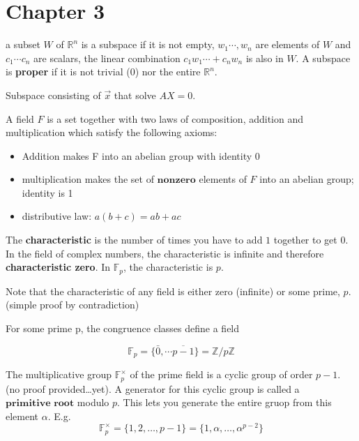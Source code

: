 \section{Chapter 3}


\begin{definition}

  a subset $W$ of $\mathbb{R}^{n}$ is a subspace if it is not empty,
  $w_{1}\cdots, w_{n}$ are elements of $W$ and $c_{1}\cdots c_{n}$ are scalars,
  the linear combination $c_{1}w_{1}\cdots + c_{n}w_{n}$ is also in $W$.
  A subspace is \textbf{proper} if it is not trivial (${0}$) nor the entire
  $\mathbb{R}^{n}$.

\end{definition}

\begin{definition}

  Subspace consisting of $\vec{x}$ that solve $AX=0$.

\end{definition}

\begin{definition}

  A field $F$ is a set together with two laws of composition,
  addition and multiplication which satisfy the following axioms:
  \begin{itemize}
    \item Addition makes F into an abelian group with identity 0
    \item multiplication makes the set of $\textbf{nonzero}$ elements
      of $F$ into an abelian group; identity is 1
    \item distributive law: $a(b+c)=ab + ac$

  \end{itemize}

  The \textbf{characteristic} is the number of times you have to add $1$ together
  to get $0$. In the field of complex numbers, the characteristic is infinite
  and therefore \textbf{characteristic zero}. In $\mathbb{F}_{p}$, the
  characteristic is $p$.

  Note that the characteristic of any field is either zero (infinite) or some
  prime, $p$. (simple proof by contradiction)


\end{definition}


\begin{definition}

  For some prime p, the congruence classes define a field

  \[\mathbb{F}_{p}=\{\bar{0},\cdots \overline{p-1}\}=\mathbb{Z}/p\mathbb{Z}\]

  The multiplicative group $\mathbb{F}_{p}^{\times}$ of the prime field is a
  cyclic group of order $p-1$. (no proof provided\ldots yet). A generator for this
  cyclic group is called a $\textbf{primitive root}$ modulo $p$. This lets you generate
  the entire gruop from this element $\alpha$. E.g.
  \[\mathbb{F}_{p}^{\times}=\{1, 2,\ldots , p-1\}=\{1, \alpha, \ldots , \alpha^{{p-2}}\}\]

\end{definition}


